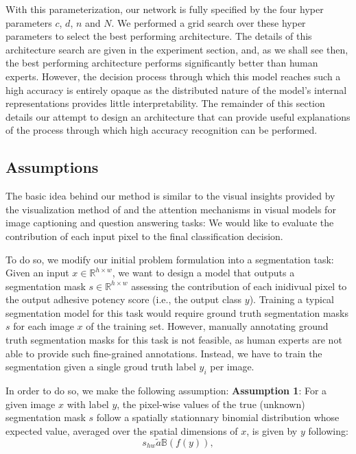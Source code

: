 \documentclass[10pt,twocolumn,letterpaper]{article}
\begin{document}
With this parameterization, our network is fully specified by the four hyper parameters $c$, $d$, $n$ and $N$.
We performed a grid search over these hyper parameters to select the best performing architecture.
The details of this architecture search are given in the experiment section,
and, as we shall see then, the best performing architecture performs significantly better than human experts.
However, the decision process through which this model reaches such a high accuracy is entirely opaque
as the distributed nature of the model's internal representations provides little interpretability.
The remainder of this section details our attempt to design an architecture that can provide 
useful explanations of the process through which high accuracy recognition can be performed.

\subsection{Assumptions}
The basic idea behind our method is similar to the visual insights provided by the
visualization method of \cite{} and the attention mechanisms in visual models 
for image captioning and question answering tasks:
We would like to evaluate the contribution of each input pixel to the final classification decision. 

To do so, we modify our initial problem formulation into a segmentation task:
Given an input $x \in \mathbb{R}^{h \times w}$, we want to design a model that outputs 
a segmentation mask $s \in \mathbb{R}^{h \times w}$ assessing the contribution of each inidivual pixel to the output adhesive potency score (i.e., the output class $y$).
Training a typical segmentation model for this task would require ground truth 
segmentation masks $s$ for each image $x$ of the training set.
However, manually annotating ground truth segmentation masks for this task is not feasible, 
as human experts are not able to provide such fine-grained annotations.
Instead, we have to train the segmentation given a single groud truth label $y_i$ per image.

In order to do so, we make the following assumption:
\textbf{Assumption 1}: 
For a given image $x$ with label $y$, 
the pixel-wise values of the true (unknown) segmentation mask $s$
follow a spatially stationnary binomial distribution whose expected value, 
averaged over the spatial dimensions of $x$, is given by $y$ following:
$$
s_{hw} \tilde{a} \mathbb{B}(f(y)),
$$
\end{document}
